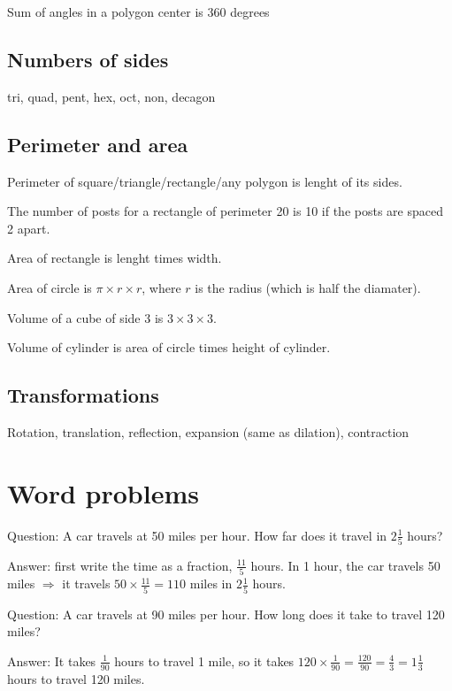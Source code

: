\documentclass[fullpage,twocolumn]{article}
\newcommand{\vp}{{\vspace{0.1in}}}
\begin{document}
Sum of angles in a polygon center is 360 degrees

\subsection{Numbers of sides}

tri, quad, pent, hex, oct, non, decagon

\subsection{Perimeter and area}

Perimeter of square/triangle/rectangle/any polygon is lenght of its sides.

The number of posts for a rectangle of perimeter
20 is 10 if the posts are spaced 2 apart.

Area of rectangle is lenght times width.

Area of circle is $\pi \times r \times r$, where $r$ is the radius (which is half the diamater).

Volume of a cube of side 3 is $3 \times 3 \times 3$.

Volume of cylinder is area of circle times height of cylinder.

\subsection{Transformations}

Rotation, translation, reflection, expansion (same as dilation), contraction


\section{Word problems}

Question: A car travels at 50 miles per hour. How far does it
travel in $2\frac{1}{5}$ hours?

\vp
Answer: first write the time as a fraction, $\frac{11}{5}$ hours.
In 1 hour, the car travels 50 miles $\Rightarrow$ it travels $50 \times \frac{11}{5} = 110$ miles in
$2\frac{1}{5}$ hours.

Question: A car travels at 90 miles per hour. How long does it take to travel 120 miles?

\vp
Answer: It takes $\frac{1}{90}$ hours to travel 1 mile, so it takes $120\times \frac{1}{90} = \frac{120}{90} = \frac{4}{3} = 1 \frac{1}{3}$ hours to travel 120 miles.
\end{document}
